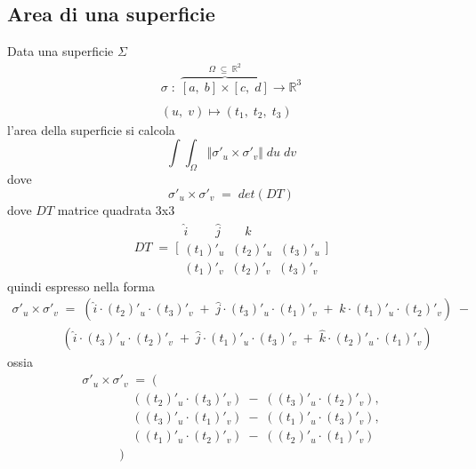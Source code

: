 \documentclass[a4paper, 10pt]{article}
\begin{document}
 			\subsection{Area di una superficie}
 				Data una superficie $ \Sigma $
 					\[
 						\begin{array}{c}
		 					\sigma\; :\; \overbrace{[a,\; b]\times[c,\; d]}^{\Omega\; \subseteq\; \mathbb{R}^2} \rightarrow \mathbb{R}^3 \\
		 					\\
		 					(u,\; v) \mapsto (t_1,\; t_2,\; t_3)
		 				\end{array}
 					\]
 				l'area della superficie si calcola
 					\[
 						\int{\int_{\Omega}^{ }{\Vert \sigma'_u\times \sigma'_v \Vert}}\; du\; dv
 					\]
 				dove
 					\[
 						\sigma'_u\times \sigma'_v\; =\; det(DT)
 					\]
 				dove $ DT $ matrice quadrata 3x3
 					\[
	 					DT\; =\; \Biggl[
		 					\begin{array}{c}
			 					\hat{i}\;\;\;\;\;\;\;\; \hat{j}\;\;\;\;\;\;\; \hat{k} \\
			 					(t_1)'_u\;\; (t_2)'_u\;\; (t_3)'_u \\
			 					(t_1)'_v\;\; (t_2)'_v\;\; (t_3)'_v
		 					\end{array}
	 					\Biggl]
 					\]
 				quindi espresso nella forma
 					\[
 						\begin{array}{c}
	 						\sigma'_u\times \sigma'_v\; =\; (\hat{i}\cdot (t_2)'_u\cdot (t_3)'_v\; +\; \hat{j}\cdot (t_3)'_u\cdot (t_1)'_v\; +\; \hat{k}\cdot (t_1)'_u\cdot (t_2)'_v)\; -\\ 
	 						\quad\quad\quad\quad(\hat{i}\cdot (t_3)'_u\cdot (t_2)'_v\; +\; \hat{j}\cdot (t_1)'_u\cdot (t_3)'_v\; +\; \hat{k}\cdot (t_2)'_u\cdot (t_1)'_v)
 						\end{array}
 					\]
 				ossia
 					\[
 						\begin{array}{l}					
	 						\sigma'_u\times \sigma'_v\; =\; ( \\
	 							\quad\quad\quad\quad((t_2)'_u\cdot (t_3)'_v)\; -\; ((t_3)'_u\cdot (t_2)'_v), \\ 
	 							\quad\quad\quad\quad((t_3)'_u\cdot (t_1)'_v)\; -\; ((t_1)'_u\cdot (t_3)'_v), \\
	 							\quad\quad\quad\quad((t_1)'_u\cdot (t_2)'_v)\; -\; ((t_2)'_u\cdot (t_1)'_v) \\
	 						\quad\quad\quad)
 						\end{array}
 					\]
 				
\end{document}
